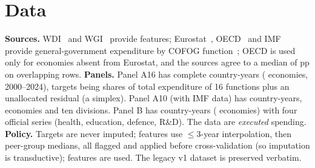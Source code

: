 \documentclass[conference]{IEEEtran}
\DeclareRobustCommand*{\_}{\textunderscore\hskip0pt\relax}
\begin{document}
\section{Data}
\textbf{Sources.} WDI~\cite{wdi} and WGI~\cite{kaufmann2011} provide \NFeatNum{} features; Eurostat~\cite{eurostat_cofog}, OECD~\cite{oecd_table11} and IMF~\cite{imf_gfs} provide general-government expenditure by COFOG function~\cite{un2000cofog}; OECD is used only for economies absent from Eurostat, and the sources agree to a median of \NXsrcMedDiff{} pp on \NOverlapRows{} overlapping rows. \textbf{Panels.} Panel A16 has \NCofogRows{} complete country-years (\NCofogCountries{} economies, 2000--2024), targets being shares of total expenditure of 16 functions plus an unallocated residual (a simplex). Panel A10 (with IMF data) has \NTenRows{} country-years, \NTenEcon{} economies and ten divisions. Panel B has \NWdiRows{} country-years (\NWdiCountries{} economies) with four official series (health, education, defence, R\&D). The data are \emph{executed} spending. \textbf{Policy.} Targets are never imputed; features use $\le$3-year interpolation, then peer-group medians, all flagged and applied before cross-validation (so imputation is transductive); \NFeatModel{} features are used. The legacy v1 dataset is preserved verbatim.
\end{document}
